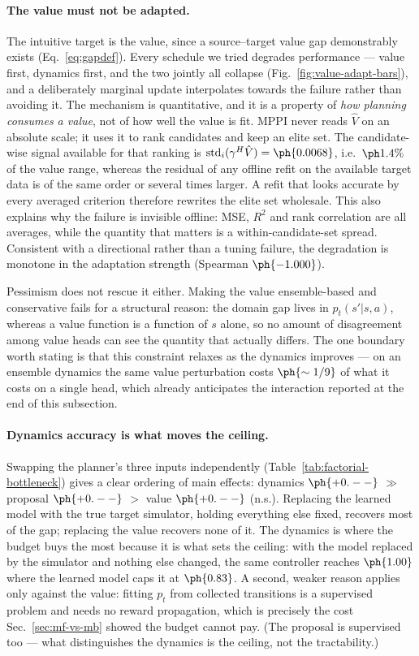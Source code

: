 \paragraph{The value must not be adapted.}
The intuitive target is the value, since a source--target value gap
demonstrably exists (Eq.~\ref{eq:gapdef}). Every schedule we tried degrades
performance --- value first, dynamics first, and the two jointly all collapse
(Fig.~\ref{fig:value-adapt-bars}), and a deliberately marginal update
interpolates towards the failure rather than avoiding it. The mechanism is
quantitative, and it is a property of \emph{how planning consumes a value},
not of how well the value is fit. MPPI never reads $\hat V$ on an absolute
scale; it uses it to rank candidates and keep an elite set. The
candidate-wise signal available for that ranking is
$\mathrm{std}_i(\gamma^H \hat V) = \ph{0.0068}$, i.e.\ $\ph{1.4\%}$ of the value
range, whereas the residual of any offline refit on the available target data is
of the same order or several times larger. A refit that looks accurate by every
averaged criterion therefore rewrites the elite set wholesale. This also
explains why the failure is invisible offline: MSE, $R^2$ and rank correlation
are all averages, while the quantity that matters is a within-candidate-set
spread. Consistent with a directional rather than a tuning failure, the
degradation is monotone in the adaptation strength (Spearman $\ph{-1.000}$).

Pessimism does not rescue it either. Making the value ensemble-based and
conservative fails for a structural reason: the domain gap lives in
$p_t(s'|s,a)$, whereas a value function is a function of $s$ alone, so no amount
of disagreement among value heads can see the quantity that actually differs.
The one boundary worth stating is that this constraint relaxes as the dynamics
improves --- on an ensemble dynamics the same value perturbation costs
$\ph{\sim1/9}$ of what it costs on a single head, which already anticipates the
interaction reported at the end of this subsection.

\paragraph{Dynamics accuracy is what moves the ceiling.}
Swapping the planner's three inputs independently
(Table~\ref{tab:factorial-bottleneck}) gives a clear ordering of main effects:
dynamics $\ph{+0.--}$ $\gg$ proposal $\ph{+0.--}$ $>$ value $\ph{+0.--}$
(n.s.). Replacing the learned model with the true target simulator, holding
everything else fixed, recovers most of the gap; replacing the value recovers
none of it. The dynamics is where the budget buys the most because it is what
sets the ceiling: with the model replaced by the simulator and nothing else
changed, the same controller reaches $\ph{1.00}$ where the learned model caps it
at $\ph{0.83}$. A second, weaker reason applies only against the value: fitting
$p_t$ from collected transitions is a supervised problem and needs no reward
propagation, which is precisely the cost Sec.~\ref{sec:mf-vs-mb} showed the
budget cannot pay. (The proposal is supervised too --- what distinguishes the
dynamics is the ceiling, not the tractability.)

